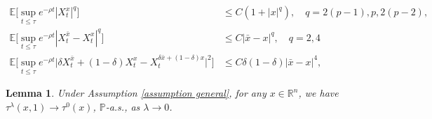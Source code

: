 \documentclass[10pt,a4paper]{amsart}
\newtheorem{lemma}{Lemma}
\def \P{\mathbb{P}}
\def \R{\mathbb{R}}
\begin{document}
\begin{align}
\label{eq estimate SDE growth SUP} 
\mathbb{E}\bigg[ \sup_{t \leq \tau}  e^{-\rho t} |  X ^x_t |^{q} \bigg]  & \leq C (1+|x|^q), \quad q = 2(p-1),p,2(p-2),  \\ 
\label{eq estimate SDE Lip SUP} 
\mathbb{E} \bigg[ \sup_{t \leq \tau}  e^{-\rho t} |  X^{\bar x}_t - X ^x_t |^{q} \bigg] & \leq C |\bar{x} - x|^q , \quad q= 2, 4  \\ 
 \label{eq estimate SDE semiconv SUP} 
 \mathbb{E} \bigg[ \sup_{t \leq \tau}  e^{-\rho t} \big|  \delta X^{\bar x}_t + (1-\delta) X^x_t - X ^{\delta \bar x + (1-\delta) x}_t \big|^2 \bigg] & \leq C \delta (1-\delta) |\bar{x} - x|^4,
\end{align}

\begin{lemma}
    \label{lemma limits stopping times}
     Under Assumption \ref{assumption general}, for any $x \in \R ^n$, we have $\tau^\lambda (x,1) \to \tau ^0(x)$, $\P$-a.s., as $\lambda \to 0$.
\end{lemma}
\end{document}
